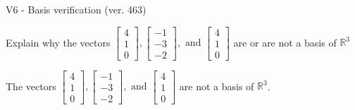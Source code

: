 \begin{exercise}
  \begin{exerciseTitle}V6 - Basis verification (ver. 463)\end{exerciseTitle}
  \begin{exerciseStatement}
    Explain why the vectors \(\left[\begin{array}{r}
4 \\
1 \\
0
\end{array}\right] , \left[\begin{array}{r}
-1 \\
-3 \\
-2
\end{array}\right] , \text{ and } \left[\begin{array}{r}
4 \\
1 \\
0
\end{array}\right]\) are or are not a basis of \(\mathbb{R}^3\)	


  \end{exerciseStatement}
  \begin{exerciseAnswer}
   The vectors \(\left[\begin{array}{r}
4 \\
1 \\
0
\end{array}\right] , \left[\begin{array}{r}
-1 \\
-3 \\
-2
\end{array}\right] , \text{ and } \left[\begin{array}{r}
4 \\
1 \\
0
\end{array}\right]\) 
  	 are not  a basis of \(\mathbb{R}^3\).
  


  \end{exerciseAnswer}
\end{exercise}